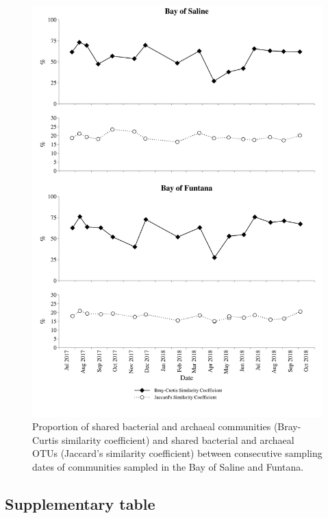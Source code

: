 \documentclass[
  12pt,
]{article}
\begin{document}
\begin{figure}[H]

{\centering \includegraphics[width=0.85\linewidth]{../results/figures/seasonal_shared} 

}

\caption{Proportion of shared bacterial and archaeal communities (Bray-Curtis similarity coefficient) and shared bacterial and archaeal OTUs (Jaccard's similarity coefficient) between consecutive sampling dates of communities sampled in the Bay of Saline and Funtana.\label{shared}}\label{fig:unnamed-chunk-3}
\end{figure}

\newpage

\hypertarget{supplementary-table}{%
\subsection{Supplementary table}\label{supplementary-table}}

\begingroup\fontsize{9}{11}\selectfont
\end{document}
